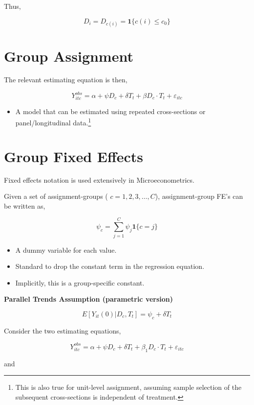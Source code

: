 \documentclass[
  letterpaper,
  DIV=11,
  numbers=noendperiod]{scrreprt}
\providecommand{\tightlist}{%
  \setlength{\itemsep}{0pt}\setlength{\parskip}{0pt}}\usepackage{longtable,booktabs,array}
\theoremstyle{definition}
\theoremstyle{remark}
\begin{document}
Thus,

\[
D_i = D_{c(i)} = \mathbf{1}\{c(i) \leq c_0\}
\]

\hypertarget{group-assignment}{%
\section{Group Assignment}\label{group-assignment}}

The relevant estimating equation is then,

\[
Y^{obs}_{itc} = \alpha + \psi D_{c} + \delta T_t + \beta D_{c} \cdot T_t + \varepsilon_{itc}
\]

\begin{itemize}
\tightlist
\item
  A model that can be estimated using repeated cross-sections or
  panel/longitudinal data.\footnote{This is also true for unit-level
    assignment, assuming sample selection of the subsequent
    cross-sections is independent of treatment.}
\end{itemize}

\hypertarget{group-fixed-effects}{%
\section{Group Fixed Effects}\label{group-fixed-effects}}

Fixed effects notation is used extensively in Microeconometrics.

Given a set of assignment-groups ( \(c = 1, 2, 3, \ldots, C\)),
assignment-group FE's can be written as,

\[
\psi_c = \sum_{j=1}^{C} \psi_j \mathbf{1}\{c = j\}
\]

\begin{itemize}
\tightlist
\item
  A dummy variable for each value.
\item
  Standard to drop the constant term in the regression equation.
\item
  Implicitly, this is a group-specific constant.
\end{itemize}

\textbf{Parallel Trends Assumption (parametric version)}

\[
E[Y_{it}(0)|D_c,T_t] = \psi_c + \delta T_t
\]

Consider the two estimating equations,

\[
Y^{obs}_{itc} = \alpha + \psi D_c + \delta T_t + \beta_1 D_c \cdot T_t + \varepsilon_{itc}
\]

and
\end{document}
